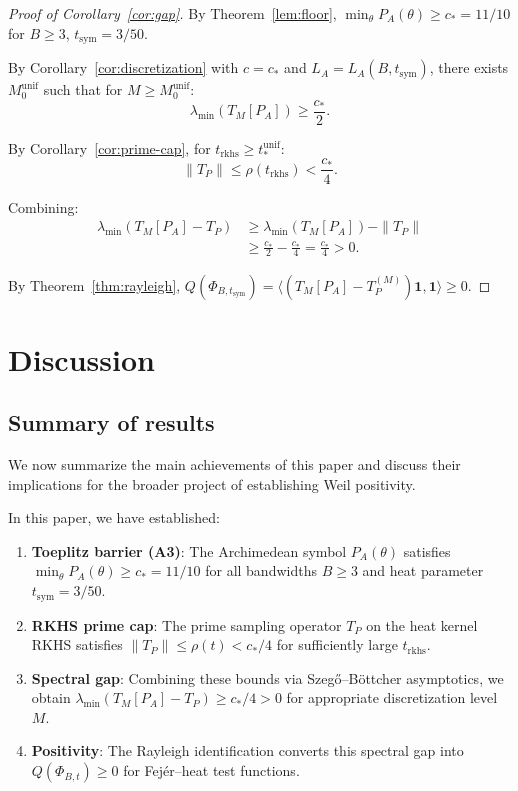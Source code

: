 \documentclass[11pt,a4paper]{article}
\theoremstyle{definition}
\theoremstyle{remark}
\begin{document}
\begin{proof}[Proof of Corollary~\ref{cor:gap}]
By Theorem~\ref{lem:floor}, $\min_\theta P_A(\theta) \geq c_* = 11/10$ for $B \geq 3$, $t_{\mathrm{sym}} = 3/50$.

By Corollary~\ref{cor:discretization} with $c = c_*$ and $L_A = L_A(B, t_{\mathrm{sym}})$, there exists $M_0^{\mathrm{unif}}$ such that for $M \geq M_0^{\mathrm{unif}}$:
\[
  \lambda_{\min}(T_M[P_A]) \geq \frac{c_*}{2}.
\]

By Corollary~\ref{cor:prime-cap}, for $t_{\mathrm{rkhs}} \geq t_*^{\mathrm{unif}}$:
\[
  \|T_P\| \leq \rho(t_{\mathrm{rkhs}}) < \frac{c_*}{4}.
\]

Combining:
\begin{align*}
  \lambda_{\min}(T_M[P_A] - T_P) &\geq \lambda_{\min}(T_M[P_A]) - \|T_P\| \\
  &\geq \frac{c_*}{2} - \frac{c_*}{4} = \frac{c_*}{4} > 0.
\end{align*}

By Theorem~\ref{thm:rayleigh}, $Q(\Phi_{B,t_{\mathrm{sym}}}) = \langle (T_M[P_A] - T_P^{(M)}) \mathbf{1}, \mathbf{1} \rangle \geq 0$.
\end{proof}

\section{Discussion}\label{sec:discussion}

\subsection{Summary of results}

We now summarize the main achievements of this paper and discuss their implications for the broader project of establishing Weil positivity.

In this paper, we have established:

\begin{enumerate}
\item \textbf{Toeplitz barrier (A3)}: The Archimedean symbol $P_A(\theta)$ satisfies $\min_\theta P_A(\theta) \geq c_* = 11/10$ for all bandwidths $B \geq 3$ and heat parameter $t_{\mathrm{sym}} = 3/50$.

\item \textbf{RKHS prime cap}: The prime sampling operator $T_P$ on the heat kernel RKHS satisfies $\|T_P\| \leq \rho(t) < c_*/4$ for sufficiently large $t_{\mathrm{rkhs}}$.

\item \textbf{Spectral gap}: Combining these bounds via Szeg\H{o}--B\"ottcher asymptotics, we obtain $\lambda_{\min}(T_M[P_A] - T_P) \geq c_*/4 > 0$ for appropriate discretization level $M$.

\item \textbf{Positivity}: The Rayleigh identification converts this spectral gap into $Q(\Phi_{B,t}) \geq 0$ for Fej\'er--heat test functions.
\end{enumerate}
\end{document}
